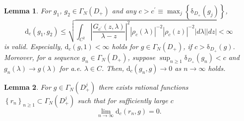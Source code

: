 \documentclass[10pt,a4paper]{amsart}
\newtheorem{lemma}{Lemma}
\begin{document}
\begin{lemma}
\label{l2-4}For $g_{1}$, $g_{2}\in\Gamma_{N}\left(  D_{+}\right)  $ and any
$c>c^{\prime}\equiv\max_{j}\left\{  \mathrm{\delta}_{D_{+}}\left(
g_{j}\right)  \right\}  $,
\[
\mathrm{d}_{c}\left(  g_{1},g_{2}\right)  \leq\sqrt{\int_{C^{2}}\left\vert
\dfrac{G_{c^{\prime}}\left(  z,\lambda\right)  }{\lambda-z}\right\vert
^{2}\left\vert \rho_{c}\left(  \lambda\right)  \right\vert ^{-2}\left\vert
\rho_{c}\left(  z\right)  \right\vert ^{-2}\left\vert d\lambda\right\vert
\left\vert dz\right\vert }<\infty
\]
is valid. Especially, $\mathrm{d}_{c}\left(  g,1\right)  <\infty$ holds for
$g\in\Gamma_{N}\left(  D_{+}\right)  $, if $c>\mathrm{\delta}_{D_{+}}\left(
g\right)  $. Moreover, for a sequence $g_{n}\in\Gamma_{N}\left(  D_{+}\right)
$, suppose $\sup_{n\geq1}\mathrm{\delta}_{D_{+}}\left(  g_{n}\right)  <c$ and
$g_{n}\left(  \lambda\right)  \rightarrow g\left(  \lambda\right)  $ for a.e.
$\lambda\in C$. Then, $\mathrm{d}_{c}\left(  g_{n},g\right)  \rightarrow0$ as
$n\rightarrow\infty$ holds.\newline
\end{lemma}

\begin{lemma}
\label{l2-8}For $g\in\Gamma_{N}\left(  D_{+}^{j}\right)  $ there exists
rational functions $\left\{  r_{n}\right\}  _{n\geq1}\subset\Gamma_{N}\left(
D_{+}^{j}\right)  $ such that for sufficiently large $c$%
\[
\lim_{n\rightarrow\infty}\mathrm{d}_{c}\left(  r_{n},g\right)  =0\text{.}%
\]

\end{lemma}
\end{document}
